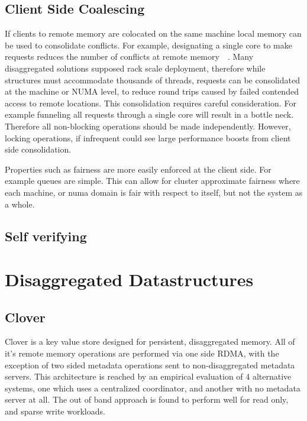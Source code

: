\subsection{Client Side Coalescing}
If clients to remote memory are colocated on the same machine local memory can
be used to consolidate conflicts. For example, designating a single core to make
requests reduces the number of conflicts at remote
memory~\cite{flat-combine}~\cite{sherman}. Many disaggregated solutions supposed
rack scale deployment, therefore while structures must accommodate thousands of
threads, requests can be consolidated at the machine or NUMA level, to reduce
round trips caused by failed contended access to remote locations. This
consolidation requires careful consideration. For example funneling all requests
through a single core will result in a bottle neck. Therefore all non-blocking
operations should be made independently. However, locking operations, if
infrequent could see large performance boosts from client side consolidation.

Properties such as fairness are more easily enforced at the client side. For
example queues are simple. This can allow for cluster approximate fairness where
each machine, or numa domain is fair with respect to itself, but not the system
as a whole.

\subsection{Self verifying}
\todo{}


\section{Disaggregated Datastructures}

\subsection{Clover}

Clover is a key value store designed for persistent, disaggregated memory. All
of it's remote memory operations are performed via one side RDMA, with the
exception of two sided metadata operations sent to non-disaggregated metadata
servers. This architecture is reached by an empirical evaluation of 4
alternative systems, one which uses a centralized coordinator, and another with
no metadata server at all. The out of band approach is found to perform well for
read only, and sparse write workloads. 

